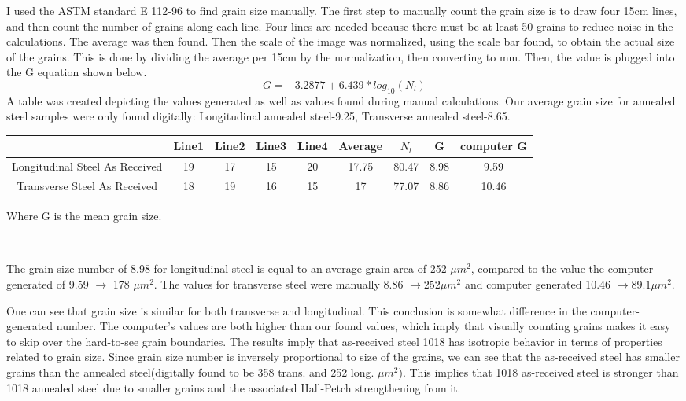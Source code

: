 \documentclass{article}
\begin{document}
I used the ASTM standard E 112-96 to find grain size manually. The first step to manually count the grain size is to draw four 15cm lines, and then count the number of grains along each line. Four lines are needed because there must be at least 50 grains to reduce noise in the calculations. The average was then found. Then the scale of the image was normalized, using the scale bar found, to obtain the actual size of the grains. This is done by dividing the average per 15cm by the normalization, then converting to mm. Then, the value is plugged into the G equation shown below.
$$G = -3.2877+6.439*log_{10}(N_l)$$
A table was created depicting the values generated as well as values found during manual calculations. Our average grain size for annealed steel samples were only found digitally: Longitudinal annealed steel-9.25, Transverse annealed steel-8.65.


\centering
\begin{tabular}{|| c | c | c | c | c | c | c | c | c ||}
 \hline
 \ & Line1 & Line2 & Line3 & Line4 & Average & $N_l$ & G & computer G\\
 \hline
 \hline
 Longitudinal Steel As Received & 19 & 17 & 15 & 20 & 17.75 & 80.47 & 8.98 & 9.59\\
 \hline
 Transverse Steel As Received & 18 & 19 & 16 & 15 & 17 & 77.07 & 8.86 & 10.46\\
 \hline
\end{tabular}
\raggedright

Where G is the mean grain size.

\ 

The grain size number of 8.98 for longitudinal steel is equal to an average grain area of 252 $\mu m^2$, compared to the value the computer generated of 9.59 $\rightarrow$ 178 $\mu m^2$. The values for transverse steel were manually 8.86 $\rightarrow 252 \mu m^2$ and computer generated 10.46 $\rightarrow 89.1 \mu m^2$.

One can see that grain size is similar for both transverse and longitudinal. This conclusion is somewhat difference in the computer-generated number. The computer's values are both higher than our found values, which imply that visually counting grains makes it easy to skip over the hard-to-see grain boundaries. The results imply that as-received steel 1018 has isotropic behavior in terms of properties related to grain size. Since grain size number is inversely proportional to size of the grains, we can see that the as-received steel has smaller grains than the annealed steel(digitally found to be 358 trans. and 252 long. $\mu m^2$). This implies that 1018 as-received steel is stronger than 1018 annealed steel due to smaller grains and the associated Hall-Petch strengthening from it.
\end{document}
